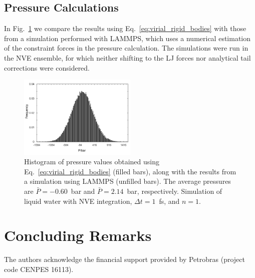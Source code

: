\documentclass[aip,jcp,reprint,amsmath,amssymb,raggedbottom]{revtex4-1}
\begin{document}
\subsection{Pressure Calculations}

In Fig.~\ref{fig:pressure} we compare the results using Eq.~\ref{eq:virial_rigid_bodies} with those from a simulation performed with LAMMPS, which uses a numerical estimation of the constraint forces in the pressure calculation. The simulations were run in the NVE ensemble, for which neither shifting to the LJ forces nor analytical tail corrections were considered. 


\begin{figure}
	\includegraphics[width=0.5\textwidth,keepaspectratio]{FiguraAna}
	\caption{Histogram of pressure values obtained using Eq.~\ref{eq:virial_rigid_bodies} (filled bars), along with the results from a simulation using LAMMPS (unfilled bars). The average pressures are $\bar{P} = -0.60$~bar and $\bar{P} = 2.14$~bar, respectively. Simulation of liquid water with NVE integration, $\Delta t = 1$~fs, and $n = 1$.}
	\label{fig:pressure}
\end{figure}

\section{Concluding Remarks}
\label{sec:conclusion}

\begin{acknowledgments}
The authors acknowledge the financial support provided by Petrobras (project code CENPES 16113).
\end{acknowledgments}
\end{document}
